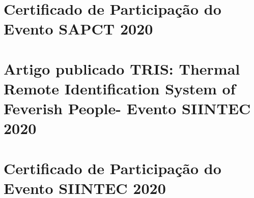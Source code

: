 \documentclass[fancyheadings, fancychapter, sureport]{Classes/a-prj}
\begin{document}
\begin{thesisappendices}
        \chapter{Certificado de Participação do Evento SAPCT 2020}
        \label{append:certificado_sapct}
        

        \chapter{Artigo publicado TRIS: Thermal Remote Identification System of Feverish People- Evento SIINTEC 2020}
        \label{append:siintec}
        
        
        \chapter{Certificado de Participação do Evento SIINTEC 2020}
        \label{append:certificado_siintec}
        



    \end{thesisappendices}
%
%
    
\end{document}
